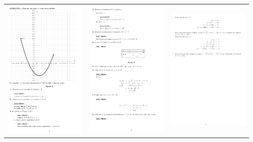  \begin{center}
 \begin{tabular}{ccc}
 \includegraphics[width=5cm,height=7cm]{./images/creation_exercice_04.png}
&
 \includegraphics[width=5cm,height=7cm]{./images/creation_exercice_05.png}
 &
 \includegraphics[width=5cm,height=7cm]{./images/creation_exercice_06.png}
\end{tabular}
\end{center}

